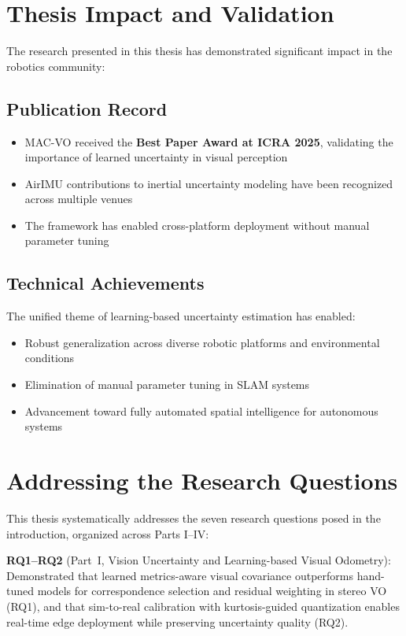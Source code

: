 \section{Thesis Impact and Validation}

The research presented in this thesis has demonstrated significant impact in the robotics community:

\subsection{Publication Record}
\begin{itemize}
    \item MAC-VO received the \textbf{Best Paper Award at ICRA 2025}, validating the importance of learned uncertainty in visual perception
    \item AirIMU contributions to inertial uncertainty modeling have been recognized across multiple venues
    \item The framework has enabled cross-platform deployment without manual parameter tuning
\end{itemize}

\subsection{Technical Achievements}
The unified theme of learning-based uncertainty estimation has enabled:
\begin{itemize}
    \item Robust generalization across diverse robotic platforms and environmental conditions
    \item Elimination of manual parameter tuning in SLAM systems
    \item Advancement toward fully automated spatial intelligence for autonomous systems
\end{itemize}

\section{Addressing the Research Questions}

This thesis systematically addresses the seven research questions posed in the introduction, organized across Parts I--IV:

\textbf{RQ1--RQ2} (Part~I, Vision Uncertainty and Learning-based Visual Odometry): Demonstrated that learned metrics-aware visual covariance outperforms hand-tuned models for correspondence selection and residual weighting in stereo VO (RQ1), and that sim-to-real calibration with kurtosis-guided quantization enables real-time edge deployment while preserving uncertainty quality (RQ2).

